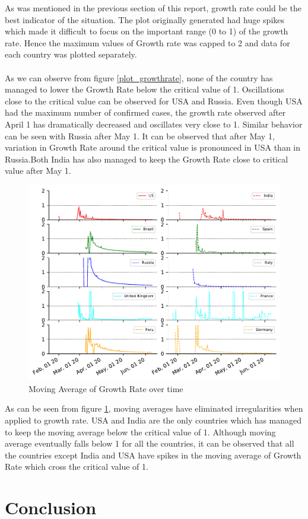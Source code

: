 \documentclass[12pt, twosided]{report}  %
\begin{document}
As was mentioned in the previous section of this report, growth rate could be the best indicator of the situation. The plot originally generated had huge spikes which made it difficult to focus on the important range (0 to 1) of the growth rate. Hence the maximum values of Growth rate was capped to 2 and data for each country was plotted separately.
\\
\\
As we can observe from figure \ref{plot_growthrate}, none of the country has managed to lower the Growth Rate below the critical value of 1. Oscillations close to the critical value can be observed for USA and Russia. Even though USA had the maximum number of confirmed cases, the growth rate observed after April 1 has dramatically decreased and oscillates very close to 1. Similar behavior can be seen with Russia after May 1. It can be observed that after May 1, variation in Growth Rate around the critical value is pronounced in USA than in Russia.Both India has also managed to keep the Growth Rate close to critical value after May 1.

\begin{figure}[H]
	\centering
	\includegraphics[width=0.5\linewidth]{./images/plot-7.pdf}
	\caption{Moving Average of Growth Rate over time}
	\label{plot_growthrateMA}
\end{figure}    

As can be seen from figure \ref{plot_growthrateMA}, moving averages have eliminated irregularities when applied to growth rate. USA and India are the only countries which has managed to keep the moving average below the critical value of 1. Although moving average eventually falls below 1 for all the countries, it can be observed that all the countries except India and USA have spikes in the moving average of Growth Rate which cross the critical value of 1.

\section{Conclusion}
\end{document}
